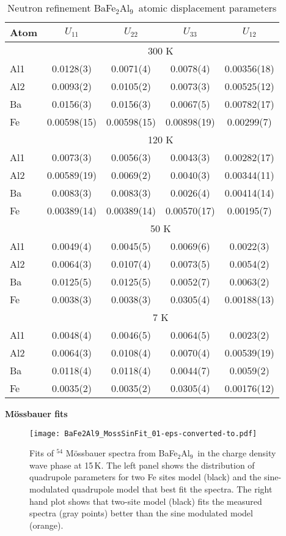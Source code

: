 \documentclass[journal=cmatex,manuscript=article]{achemso}
\newcommand{\BaFeAl}{BaFe$_2$Al$_9$}
\begin{document}
\begin{suppinfo}
\begin{table}
	\caption{Neutron refinement \BaFeAl\ atomic displacement parameters}
	\label{tbl:NeutronRefADPs}
	\begin{tabular}{l| c c c c}
		Atom &$U_{11}$ &$U_{22}$ &$U_{33}$ &$U_{12}$\\
		\hline
		&\multicolumn{4}{c}{300 K}\\
		Al1 &0.0128(3) &0.0071(4) &0.0078(4) &0.00356(18)\\
		Al2 &0.0093(2) &0.0105(2) &0.0073(3) &0.00525(12)\\
		Ba &0.0156(3) &0.0156(3) &0.0067(5) &0.00782(17)\\
		Fe &0.00598(15) &0.00598(15) &0.00898(19) &0.00299(7)\\
		\hline
		&\multicolumn{4}{c}{120 K}\\
		Al1 &0.0073(3) &0.0056(3) &0.0043(3) &0.00282(17)\\
		Al2 &0.00589(19) &0.0069(2) &0.0040(3) &0.00344(11)\\
		Ba &0.0083(3) &0.0083(3) &0.0026(4) &0.00414(14)\\
		Fe &0.00389(14) &0.00389(14) &0.00570(17) &0.00195(7)\\
		\hline
		&\multicolumn{4}{c}{50 K}\\
		Al1 &0.0049(4) &0.0045(5) &0.0069(6) &0.0022(3)\\
		Al2 &0.0064(3) &0.0107(4) &0.0073(5) &0.0054(2)\\
		Ba &0.0125(5) &0.0125(5) &0.0052(7) &0.0063(2)\\
		Fe &0.0038(3) &0.0038(3) &0.0305(4) &0.00188(13)\\
		\hline
		&\multicolumn{4}{c}{7 K}\\
		Al1 &0.0048(4) &0.0046(5) &0.0064(5) &0.0023(2)\\
		Al2 &0.0064(3) &0.0108(4) &0.0070(4) &0.00539(19)\\
		Ba &0.0118(4) &0.0118(4) &0.0044(7) &0.0059(2)\\
		Fe &0.0035(2) &0.0035(2) &0.0305(4) &0.00176(12)\\
		
	\end{tabular}
\end{table}

\textbf{M\"ossbauer fits}
\label{sec:suppinfo_Mossbauer}

\begin{figure}
	\texttt{[image: BaFe2Al9\_MossSinFit\_01-eps-converted-to.pdf]}
	\caption{\label{fig:SI_MossbauerFits} 
		Fits of $^{54}$ M\"ossbauer spectra from \BaFeAl\ in the charge density wave phase at 15\,K. The left panel shows the distribution of quadrupole parameters for two Fe sites model (black) and the sine-modulated quadrupole model that best fit the spectra. The right hand plot shows that two-site model (black) fits the measured spectra (gray points) better than the sine modulated model (orange).
	}
\end{figure}


\end{suppinfo}
\end{document}
